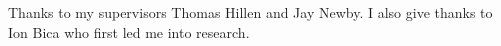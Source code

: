 \documentclass[\main/thesis.tex]{subfiles}
\begin{document}
\begin{acknowledgements} 
Thanks to my supervisors Thomas Hillen and Jay Newby. I also give thanks to Ion Bica who first led me into research.
\end{acknowledgements}
\end{document}
